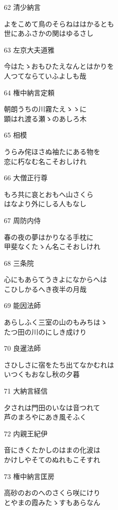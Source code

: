 \begin{shiika}
\end{shiika}62 清少納言     \begin{shiika}よをこめて鳥のそらねははかるとも\\世にあふさかの関はゆるさし 
\end{shiika}63 左京大夫道雅 \begin{shiika}今はたゝおもひたえなんとはかりを\\人つてならていふよしも哉 
\end{shiika}64 権中納言定頼 \begin{shiika}朝朗うちの川霧たえゝゝに\\顕はれ渡る瀬ゝのあしろ木 
\end{shiika}65 相模         \begin{shiika}うらみ侘ほさぬ袖たにある物を\\恋に朽なむ名こそおしけれ 
\end{shiika}66 大僧正行尊   \begin{shiika}もろ共に哀とおもへ山さくら\\はなより外にしる人もなし 
\end{shiika}67 周防内侍     \begin{shiika}春の夜の夢はかりなる手枕に\\甲斐なくたゝん名こそおしけれ 
\end{shiika}68 三条院       \begin{shiika}心にもあらてうきよになからへは\\こひしかるへき夜半の月哉 
\end{shiika}69 能因法師     \begin{shiika}あらしふく三室の山のもみちはゝ\\たつ田の川のにしき成けり 
\end{shiika}70 良暹法師     \begin{shiika}さひしさに宿をたち出てなかむれは\\いつくもおなし秋の夕暮 
\end{shiika}71 大納言経信   \begin{shiika}夕されは門田のいなは音つれて\\芦のまろやにあき風そふく 
\end{shiika}72 内親王紀伊   \begin{shiika}音にきくたかしのはまの化波は\\かけしやそてのぬれもこそすれ 
\end{shiika}73 権中納言匡房 \begin{shiika}高砂のおのへのさくら咲にけり\\とやまの霞みたゝすもあらなん 

\end{shiika}
